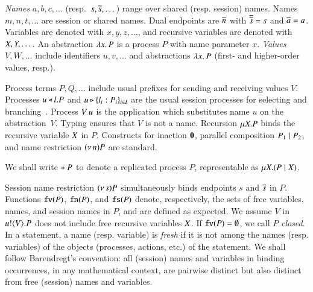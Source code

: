 \documentclass[preprint,11pt]{elsarticle}
\begin{document}
{%
\emph{Names} $a,b,c, \dots$ (resp.~$s, \overline{s}, \dots$) 
range over shared (resp. session) names. 
Names $m, n, t, \dots$ are session or shared names.
Dual endpoints are $\overline{n}$ with
$\overline{\overline{s}} = s$ and $\overline{a} = a$.
Variables are denoted with $x, y, z, \dots$, 
and recursive variables are denoted with $X, Y, \dots$.
An abstraction %
$\lambda x.\,P$ is a process $P$ with name parameter $x$.
\emph{Values} $V,W, \ldots$ include 
identifiers $u, v, \ldots$ %
and 
abstractions $\lambda x.\,P$ (first- and higher-order values, resp.). 


Process terms $P, Q, \ldots$ 
include usual %
prefixes for sending and receiving values $V$.
Processes $u \triangleleft l . P$ and $u \triangleright \{l_i: P_i\}_{i \in I}$ are the
usual session processes for selecting and branching~\cite{honda.vasconcelos.kubo:language-primitives}.
Process 
$V\, {u}$ 
is the application
which substitutes name $u$ on the abstraction~$V$. 
Typing  ensures that $V$ is not a name.
Recursion   $\mu X. P$ binds the recursive variable $X$ in   $P$.
Constructs for 
inaction $\mathbf{0}$,  parallel composition $P_1 \;|\; P_2$, and 
name restriction $(\nu\, n) P$ are standard.

\begin{notation}\label{not:repl}
We shall write $\ast\;P$ to denote a replicated process $P$, representable as $\mu X. (P \;|\; X)$. 
\end{notation}

Session name restriction $(\nu\, s) P$ simultaneously binds endpoints $s$ and $\overline{s}$ in $P$.
Functions $\mathtt{fv}(P)$, $\mathtt{fn}(P)$, and $\mathtt{fs}(P)$ denote, respectively, the sets of free 
variables, names, and session names in $P$, and are defined as expected.
We assume $V$ in $u ! \langle V \rangle .{P}$ does not include free recursive 
variables $X$.
If $\mathtt{fv}(P) = \emptyset$, we call $P$ {\em closed}.
In a statement, a name (resp. variable) is \emph{fresh} if it is not among the names (resp. variables) of the objects (processes, actions, etc.) of the statement.
We shall follow Barendregt's convention:
all (session) names and variables in binding occurrences, in any mathematical context, are pairwise distinct but also distinct from  free (session) names and variables.

}
\end{document}
